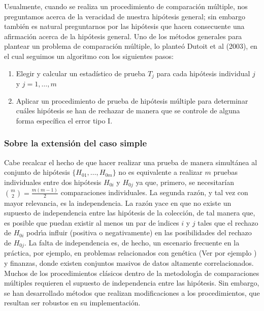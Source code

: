 \documentclass[11pt,letterpaper]{article}
\begin{document}
Usualmente, cuando se realiza un procedimiento de comparación múltiple, nos preguntamos acerca de la veracidad de nuestra hipótesis general; sin embargo también es natural preguntarnos por las hipótesis que hacen consecuente una afirmación acerca de la hipótesis general. Uno de los métodos generales para plantear un problema de comparación múltiple, lo planteó Dutoit et al (2003), en el cual seguimos un algoritmo con los siguientes pasos:

\begin{enumerate}[I]
	\item Elegir y calcular un estadístico de prueba $T_j$ para cada hipótesis individual $j$ y $j=1,\dots,m$
	\item Aplicar un procedimiento de prueba de hipótesis múltiple para determinar cuáles hipótesis se han
	de rechazar de manera que se controle de alguna forma específica el error tipo I.
\end{enumerate}

\subsubsection{Sobre la extensión del caso simple}
Cabe recalcar el hecho de que hacer realizar una prueba de manera simultánea al conjunto de hipótesis $\{H_{01},\dots,H_{0m}\}$ no es equivalente a realizar $m$ pruebas individuales entre dos hipótesis $H_{0i}$ y $H_{0j}$ ya que, primero, se necesitarían ${m\choose 2}=\frac{m(m-1)}{2}$ comparaciones individuales. La segunda razón, y tal vez con mayor relevancia, es la independencia.
La razón yace en que no existe un supuesto de
independencia entre las hipótesis de la colección, de tal manera que, es posible que puedan existir al
menos un par de ı́ndices $i$ y $j$ tales que el rechazo de $H_{0i}$ podrı́a influir (positiva o negativamente) en las
posibilidades del rechazo de $H_{0j}$. La falta de independencia es, de hecho, un escenario frecuente en la
práctica, por ejemplo, en problemas relacionados con genética (Ver por ejemplo \cite{Sandrine}) y finanzas, donde existen conjuntos masivos
de datos altamente correlacionados. Muchos de los procedimientos clásicos dentro de la metodologı́a de
comparaciones múltiples requieren el supuesto de independencia entre las hipótesis. Sin embargo, se han desarrollado métodos  que realizan modificaciones a los procedimientos, que resultan ser robustos en su implementación.
\end{document}
